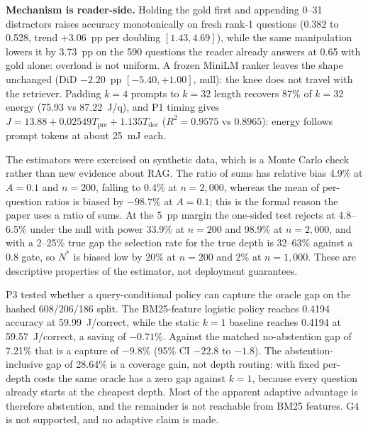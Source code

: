 \documentclass[a4paper,fleqn]{cas-sc}
\begin{document}
\label{sec:simulations}

\textbf{Mechanism is reader-side.} Holding the gold first and appending 0--31 distractors raises accuracy monotonically on fresh rank-1 questions (0.382 to 0.528, trend $+3.06$~pp per doubling $[1.43, 4.69]$), while the same manipulation lowers it by 3.73~pp on the 590 questions the reader already answers at 0.65 with gold alone: overload is not uniform. A frozen MiniLM ranker leaves the shape unchanged (DiD $-2.20$~pp $[-5.40, +1.00]$, null): the knee does not travel with the retriever. Padding $k=4$ prompts to $k=32$ length recovers 87\% of $k=32$ energy (75.93 vs 87.22~J/q), and P1 timing gives $J=13.88+0.02549T_{\mathrm{pre}}+1.135T_{\mathrm{dec}}$ ($R^{2}=0.9575$ vs $0.8965$): energy follows prompt tokens at about 25~mJ each.

The estimators were exercised on synthetic data, which is a Monte Carlo check rather than new evidence about RAG. The ratio of sums has relative bias 4.9\% at $A=0.1$ and $n=200$, falling to 0.4\% at $n=2{,}000$, whereas the mean of per-question ratios is biased by $-98.7$\% at $A=0.1$; this is the formal reason the paper uses a ratio of sums. At the 5~pp margin the one-sided test rejects at 4.8--6.5\% under the null with power 33.9\% at $n=200$ and 98.9\% at $n=2{,}000$, and with a 2--25\% true gap the selection rate for the true depth is 32--63\% against a 0.8 gate, so $N^{*}$ is biased low by 20\% at $n=200$ and 2\% at $n=1{,}000$. These are descriptive properties of the estimator, not deployment guarantees.

P3 tested whether a query-conditional policy can capture the oracle gap on the hashed 608/206/186 split. The BM25-feature logistic policy reaches 0.4194 accuracy at 59.99~J/correct, while the static $k=1$ baseline reaches 0.4194 at 59.57~J/correct, a saving of $-0.71$\%. Against the matched no-abstention gap of 7.21\% that is a capture of $-9.8$\% (95\% CI $-22.8$ to $-1.8$). The abstention-inclusive gap of 28.64\% is a coverage gain, not depth routing: with fixed per-depth costs the same oracle has a zero gap against $k=1$, because every question already starts at the cheapest depth. Most of the apparent adaptive advantage is therefore abstention, and the remainder is not reachable from BM25 features. G4 is not supported, and no adaptive claim is made.
\end{document}

